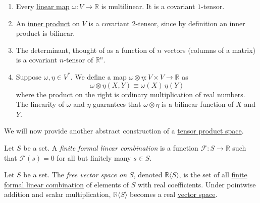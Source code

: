 \documentclass{article}
\newcounter{definition}[section]
\newcounter{example}[section]
\begin{document}
    \begin{example}
      \label{ex:covariant-tensors}
    \begin{enumerate}
        \item Every \hyperref[lin-def:linear_map]{linear map} $\omega: V \to \mathbb{R}$ is multilinear. It is a covariant $1$-tensor. 
        \item An \hyperref[lin-def:inner-product]{inner product} on $V$ is a covariant $2$-tensor, since by definition an inner product is bilinear.  
        \item The determinant, thought of as a function of $n$ vectors (columns of a matrix) is a covariant $n$-tensor of $\mathbb{R}^n$. 
        \item Suppose $\omega, \eta \in V^*$. We define a map $\omega \otimes \eta: V \times V \to \mathbb{R}$ as
        \begin{equation}
          \omega \otimes \eta (X, Y) \equiv \omega (X) \, \eta(Y)
        \end{equation}
        where the product on the right is ordinary multiplication of real numbers. The linearity of $\omega$ and $\eta$ guarantees that $\omega \otimes \eta$ is a bilinear function of $X$ and $Y$. 
    \end{enumerate}
    \end{example}

    We will now provide another abstract construction of a \hyperref[lin-def:tensor]{tensor product space}. 

    \begin{definition}
      \label{def:finite-formal-linear-combination}
    Let $S$ be a set. A \textit{finite formal linear combination} is a function $\mathcal{F}: S\to \mathbb{R}$ such that $\mathcal{F}(s) = 0$ for all but finitely many $s \in S$. 
    \end{definition}

    \begin{definition}
      \label{def:free-vector-space-on-s}
    Let $S$ be a set. The \textit{free vector space on $S$}, denoted $\mathbb{R} \langle S \rangle$, is the set of all \hyperref[def:finite-formal-linear-combination]{finite formal linear combination} of elements of $S$ with real coefficients. Under pointwise addition and scalar multiplication, $\mathbb{R} \langle S \rangle$ becomes a real \hyperref[lin-def:vector-space]{vector space}. 
    \end{definition}
\end{document}
